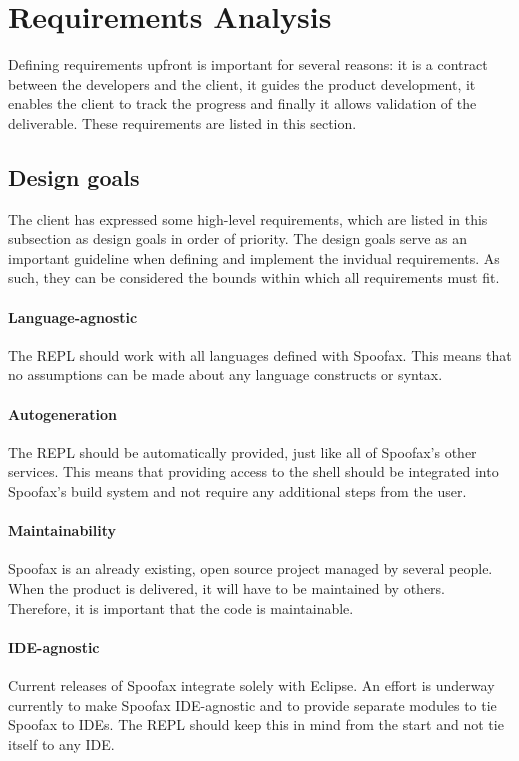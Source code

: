 \section{Requirements Analysis}
\label{sec:requirement-analysis}

Defining requirements upfront is important for several reasons: it is a contract
between the developers and the client, it guides the product development, it
enables the client to track the progress and finally it allows validation of the
deliverable. These requirements are listed in this section.

\subsection{Design goals}
\label{ssec:goals}

The client has expressed some high-level requirements, which are listed in this
subsection as design goals in order of priority. The design goals serve as an
important guideline when defining and implement the invidual requirements. As
such, they can be considered the bounds within which all requirements must fit.

\paragraph{Language-agnostic} The REPL should work with all languages
defined with Spoofax. This means that no assumptions can be made about any
language constructs or syntax.

\paragraph{Autogeneration} The REPL should be automatically provided, just like
all of Spoofax's other services. This means that providing access to the shell
should be integrated into Spoofax's build system and not require any additional
steps from the user.

\paragraph{Maintainability} Spoofax is an already existing, open source project
managed by several people. When the product is delivered, it will have to be
maintained by others. Therefore, it is important that the code is maintainable.

\paragraph{IDE-agnostic} Current releases of Spoofax integrate solely with
Eclipse. An effort is underway currently to make Spoofax IDE-agnostic and to
provide separate modules to tie Spoofax to IDEs. The REPL should keep this in
mind from the start and not tie itself to any IDE.

